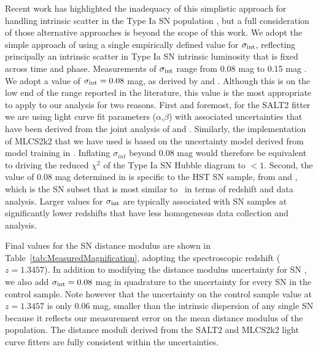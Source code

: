 Recent work has highlighted the inadequacy of this simplistic approach
for handling intrinsic scatter in the Type Ia SN
population \citep{Marriner:2011,Kessler:2013,Mosher:2014,Scolnic:2014a,Betoule:2014},
but a full consideration of those alternative approaches is beyond the
scope of this work.  We adopt the simple approach of using a single
empirically defined value for $\sigma_{\rm int}$, reflecting
principally an intrinsic scatter in Type Ia SN intrinsic luminosity
that is fixed across time and phase.  Measurements of $\sigma_{\rm
int}$ range from 0.08 mag \citep{Jha:2007,Conley:2011} to 0.15
mag \citep{Kessler:2009b,Suzuki:2012}.  We adopt a value of
$\sigma_{\rm int}=0.08$ mag, as derived by \citet{Jha:2007}
and \citet{Conley:2011}.  Although this is on the low end of the range
reported in the literature, this value is the most appropriate to
apply to our analysis for two reasons.  First and foremost, for the
SALT2 fitter we are using light curve fit parameters
($\alpha$,$\beta$) with associated uncertainties that have been
derived from the joint analysis of \citet{Conley:2011}
and \citet{Sullivan:2011}. Similarly, the implementation of MLCS2k2
that we have used is based on the uncertainty model derived from model
training in \citet{Jha:2007}.  Inflating $\sigma_{int}$ beyond 0.08
mag would therefore be equivalent to driving the reduced $\chi^2$ of
the Type Ia SN Hubble diagram to $<1$.  Second, the value of 0.08 mag
determined in \citet{Conley:2011} is specific to the HST SN sample,
from \citet{Riess:2007} and \citet{Suzuki:2012}, which is the SN
subset that is most similar to \tomas\ in terms of redshift and data
analysis.  Larger values for $\sigma_{\rm int}$ are typically
associated with SN samples at significantly lower redshifts that have
less homogeneous data collection and analysis. 

Final values for the SN distance modulus are shown in
Table~\ref{tab:MeasuredMagnification}, adopting the spectroscopic
redshift ($z=1.3457$).  In addition to modifying the distance modulus
uncertainty for SN \tomas, we also add $\sigma_{\rm int}=0.08$ mag in
quadrature to the uncertainty for every SN in the control sample. Note
however that the uncertainty on the control sample value at $z=1.3457$
is only 0.06 mag, smaller than the intrinsic dispersion of
any single SN because it reflects our measurement error on the mean
distance modulus of the population.  The distance moduli derived from
the SALT2 and MLCS2k2 light curve fitters are fully consistent within
the uncertainties. 


